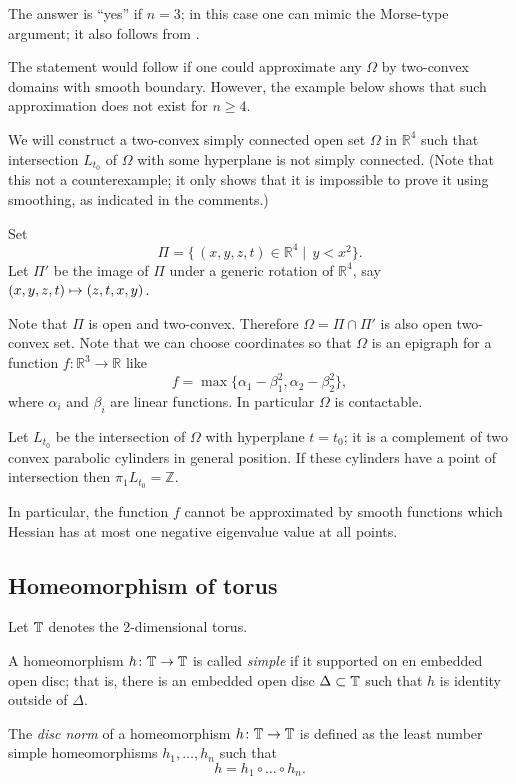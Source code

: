 The answer is ``yes'' if $n=3$; in this case one can mimic the Morse-type argument;
it also follows from \cite[4.5.2 in][]{AKP-invitation}.

The statement would follow if one could approximate any $\Omega$ by two-convex domains with smooth boundary. However, the example below shows that such approximation does not exist for $n\ge 4$.


 We will construct a two-convex simply connected open set $\Omega$ in $\mathbb R^4$ such that intersection $L_{t_0}$ of $\Omega$ with some hyperplane is not simply connected.
(Note that this not a counterexample;
it only shows that it is impossible to prove it using smoothing, as indicated in the comments.)

Set 
$$\Pi=\{\,(x,y,z,t)\in\mathbb R^4\mid\,y< x^2\}.$$
Let $\Pi'$ be the image of $\Pi$ under a generic rotation of $\mathbb R^4$,
say $(x,y,z,t)\z\mapsto(z,t,x,y)$.

Note that $\Pi$ is open and two-convex.
Therefore $\Omega=\Pi\cap \Pi'$ is also open two-convex set.
Note that we can choose coordinates so that $\Omega$ is an epigraph for a function $f\colon\mathbb R^3\to\mathbb R$ like
$$f=\max\{\alpha_1-\beta_1^2,\alpha_2-\beta_2^2 \},$$
where $\alpha_i$ and $\beta_i$ are linear functions.
In particular $\Omega$ is contactable.

Let $L_{t_0}$ be the intersection of $\Omega$ with hyperplane $t=t_0$;
it is a complement of two convex parabolic cylinders in general position. 
If these cylinders have a point of intersection then $\pi_1 L_{t_0}=\mathbb Z$.
 
In particular, the function $f$ cannot be approximated by smooth functions which Hessian has at most one negative eigenvalue value at all points.
 
\subsection*{Homeomorphism of torus}

Let $\mathbb{T}$ denotes the 2-dimensional torus.

A homeomorphism $h\colon\mathbb{T}\to \mathbb{T}$ is called \emph{simple} if it supported on en embedded open disc;
that is, there is an embedded open disc $\Delta\subset \mathbb{T}$ such that $h$ is identity outside of $\Delta$.

The \emph{disc norm} of a homeomorphism $h\colon\mathbb{T}\to \mathbb{T}$ is defined as the least number simple homeomorphisms $h_1,\dots,h_n$ such that
\[h=h_1\circ\dots\circ h_n.\]

